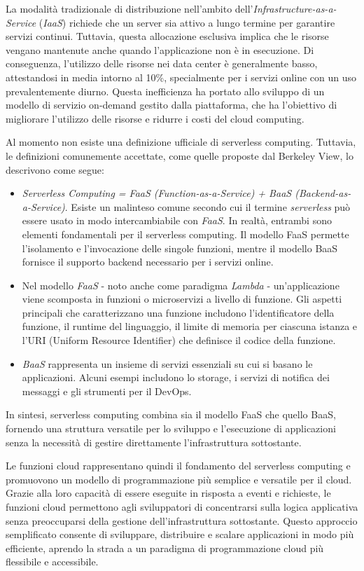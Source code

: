 La modalità tradizionale di distribuzione nell’ambito dell’\textit{Infrastructure-as-a-Service} (\textit{IaaS}) richiede che un server sia attivo a lungo termine per garantire servizi continui. Tuttavia, questa allocazione esclusiva implica che le risorse vengano mantenute anche quando l’applicazione non è in esecuzione. Di conseguenza, l'utilizzo delle risorse nei data center è generalmente basso, attestandosi in media intorno al 10\%, specialmente per i servizi online con un uso prevalentemente diurno. Questa inefficienza ha portato allo sviluppo di un modello di servizio on-demand gestito dalla piattaforma, che ha l’obiettivo di migliorare l’utilizzo delle risorse e ridurre i costi del cloud computing.

Al momento non esiste una definizione ufficiale di serverless computing. Tuttavia, le definizioni comunemente accettate, come quelle proposte dal Berkeley View, lo descrivono come segue:
\begin{itemize}
    \item \textit{Serverless Computing = FaaS (Function-as-a-Service) + BaaS (Backend-as-a-Service)}. Esiste un malinteso comune secondo cui il termine \textit{serverless} può essere usato in modo intercambiabile con \textit{FaaS}. In realtà, entrambi sono elementi fondamentali per il serverless computing. Il modello FaaS permette l'isolamento e l'invocazione delle singole funzioni, mentre il modello BaaS fornisce il supporto backend necessario per i servizi online.
    \item Nel modello \textit{FaaS} - noto anche come paradigma \textit{Lambda} - un’applicazione viene scomposta in funzioni o microservizi a livello di funzione. Gli aspetti principali che caratterizzano una funzione includono l'identificatore della funzione, il runtime del linguaggio, il limite di memoria per ciascuna istanza e l'URI (Uniform Resource Identifier) che definisce il codice della funzione.
    \item \textit{BaaS} rappresenta un insieme di servizi essenziali su cui si basano le applicazioni. Alcuni esempi includono lo storage, i servizi di notifica dei messaggi e gli strumenti per il DevOps.
\end{itemize}
In sintesi, serverless computing combina sia il modello FaaS che quello BaaS, fornendo una struttura versatile per lo sviluppo e l'esecuzione di applicazioni senza la necessità di gestire direttamente l'infrastruttura sottostante.

Le funzioni cloud rappresentano quindi il fondamento del serverless computing e promuovono un modello di programmazione più semplice e versatile per il cloud. Grazie alla loro capacità di essere eseguite in risposta a eventi e richieste, le funzioni cloud permettono agli sviluppatori di concentrarsi sulla logica applicativa senza preoccuparsi della gestione dell'infrastruttura sottostante. Questo approccio semplificato consente di sviluppare, distribuire e scalare applicazioni in modo più efficiente, aprendo la strada a un paradigma di programmazione cloud più flessibile e accessibile.

